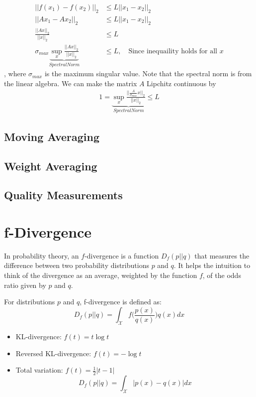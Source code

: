 \begin{appendices}
\begin{align*}
	||f(x_1)-f(x_2)||_2 &\leq L||x_1-x_2||_2\\
	||Ax_1-Ax_2||_2 &\leq L||x_1-x_2||_2\\
	\frac{||Ax||_2}{||x||_2}&\leq L\\
	\sigma_{max}\underbrace{\sup_x \frac{||Ax||_2}{||x||_2}}_{Spectral Norm}&\leq L, \quad \textrm{Since inequaility holds for all }x
\end{align*}
, where $\sigma_{max}$ is the maximum singular value. Note that the spectral norm is from the linear algebra. We can make the matrix $A$ Lipchitz continuous by 
\begin{align*}
1 = \underbrace{\sup_x \frac{||\frac{A}{\sigma_{max}}x||_2}{||x||_2}}_{Spectral Norm}\leq L
\end{align*}


\subsection{Moving Averaging}

\subsection{Weight Averaging}

\subsection{Quality Measurements}

\section{f-Divergence}
In probability theory, an $f$-divergence is a function $D_{f}(p||q)$ that measures the difference between two probability distributions $p$ and $q$. It helps the intuition to think of the divergence as an average, weighted by the function $f$, of the odds ratio given by $p$ and $q$.

For distributions $p$ and $q$, f-divergence is defined as:
$$D_{f}(p||q) = \int_{\mathcal{X}}f\Bigg(\frac{p(x)}{q(x)}\Bigg)q(x)dx$$

\begin{itemize}
	\item KL-divergence: $f(t) = t\log t$
	\item Reversed KL-divergence: $f(t) = -\log t$
	\item Total variation: $f(t) = \frac{1}{2}|t-1|$
	$$D_{f}(p||q) = \int_{\mathcal{X}}|p(x)-q(x)|dx$$
\end{itemize}


\end{appendices}
